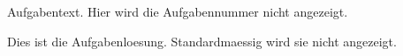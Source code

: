 \begin{atiTask}[
  title = Aufgabentitel,
  type = Aufgabentyp,
  points = 5
]
  Aufgabentext.
  Hier wird die Aufgabennummer nicht angezeigt.
\end{atiTask}
\begin{atiSolution}
  Dies ist die Aufgabenloesung.
  Standardmaessig wird sie nicht angezeigt.
\end{atiSolution}